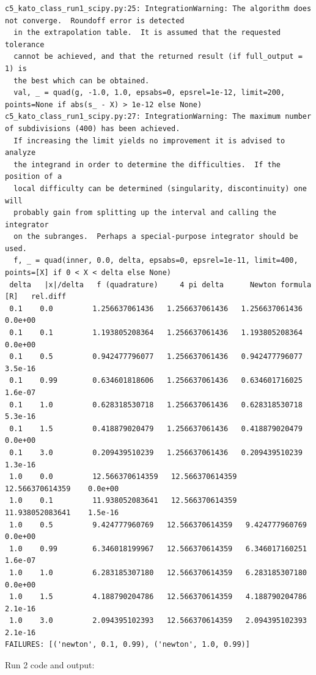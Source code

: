 \documentclass[11pt,a4paper]{article}
\begin{document}
\begin{lstlisting}
c5_kato_class_run1_scipy.py:25: IntegrationWarning: The algorithm does not converge.  Roundoff error is detected
  in the extrapolation table.  It is assumed that the requested tolerance
  cannot be achieved, and that the returned result (if full_output = 1) is 
  the best which can be obtained.
  val, _ = quad(g, -1.0, 1.0, epsabs=0, epsrel=1e-12, limit=200, points=None if abs(s_ - X) > 1e-12 else None)
c5_kato_class_run1_scipy.py:27: IntegrationWarning: The maximum number of subdivisions (400) has been achieved.
  If increasing the limit yields no improvement it is advised to analyze 
  the integrand in order to determine the difficulties.  If the position of a 
  local difficulty can be determined (singularity, discontinuity) one will 
  probably gain from splitting up the interval and calling the integrator 
  on the subranges.  Perhaps a special-purpose integrator should be used.
  f, _ = quad(inner, 0.0, delta, epsabs=0, epsrel=1e-11, limit=400, points=[X] if 0 < X < delta else None)
 delta   |x|/delta   f (quadrature)     4 pi delta      Newton formula [R]   rel.diff
 0.1    0.0         1.256637061436   1.256637061436   1.256637061436    0.0e+00
 0.1    0.1         1.193805208364   1.256637061436   1.193805208364    0.0e+00
 0.1    0.5         0.942477796077   1.256637061436   0.942477796077    3.5e-16
 0.1    0.99        0.634601818606   1.256637061436   0.634601716025    1.6e-07
 0.1    1.0         0.628318530718   1.256637061436   0.628318530718    5.3e-16
 0.1    1.5         0.418879020479   1.256637061436   0.418879020479    0.0e+00
 0.1    3.0         0.209439510239   1.256637061436   0.209439510239    1.3e-16
 1.0    0.0         12.566370614359   12.566370614359   12.566370614359    0.0e+00
 1.0    0.1         11.938052083641   12.566370614359   11.938052083641    1.5e-16
 1.0    0.5         9.424777960769   12.566370614359   9.424777960769    0.0e+00
 1.0    0.99        6.346018199967   12.566370614359   6.346017160251    1.6e-07
 1.0    1.0         6.283185307180   12.566370614359   6.283185307180    0.0e+00
 1.0    1.5         4.188790204786   12.566370614359   4.188790204786    2.1e-16
 1.0    3.0         2.094395102393   12.566370614359   2.094395102393    2.1e-16
FAILURES: [('newton', 0.1, 0.99), ('newton', 1.0, 0.99)]
\end{lstlisting}

Run 2 code and output:
\end{document}
